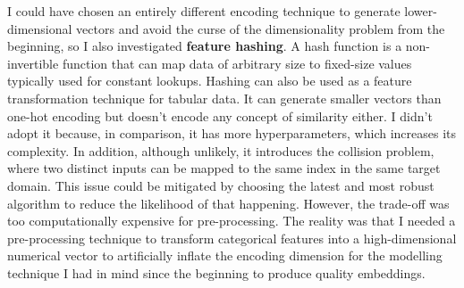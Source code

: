 I could have chosen an entirely different encoding technique to generate lower-dimensional vectors
and avoid the curse of the dimensionality problem from the beginning, so I also investigated \textbf{feature hashing}.
A hash function is a non-invertible function that can map data of arbitrary size to fixed-size values typically used for constant lookups.
Hashing can also be used as a feature transformation technique for tabular data.
It can generate smaller vectors than one-hot encoding but doesn't encode any concept of similarity either.
I didn't adopt it because, in comparison, it has more hyperparameters, which increases its complexity.
In addition, although unlikely, it introduces the collision problem,
where two distinct inputs can be mapped to the same index in the same target domain.
This issue could be mitigated by choosing the latest and most robust algorithm to reduce the likelihood of that happening.
However, the trade-off was too computationally expensive for pre-processing.
The reality was that I needed a pre-processing technique to transform categorical features into a high-dimensional numerical vector
to artificially inflate the encoding dimension for the modelling technique I had in mind since the beginning to produce quality embeddings.
